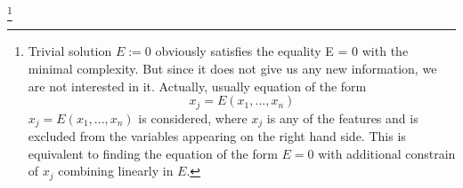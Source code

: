 \documentclass[runningheads]{llncs}
\begin{document}










\footnote{
    \label{foot:eq}
Trivial solution $E:= 0$ obviously satisfies the equality E = 0 with the minimal complexity. 
But since it does not give us any new information, we are not interested in it.
Actually, usually equation of the form 
\begin{equation} \label{eq:ed}
    x_j = E(x_1, ..., x_n)
\end{equation}  
$x_j = E(x_1, ..., x_n)$ is considered, where $x_j$ is any of the features and
is excluded from the variables appearing on the right hand side.
This is equivalent to finding the equation of the form $E = 0$ with additional
constrain of $x_j$ combining linearly in $E$.
}









\cite{kera2023monomialagnostic}


\cite{Diofantos}





% 

\end{document}
